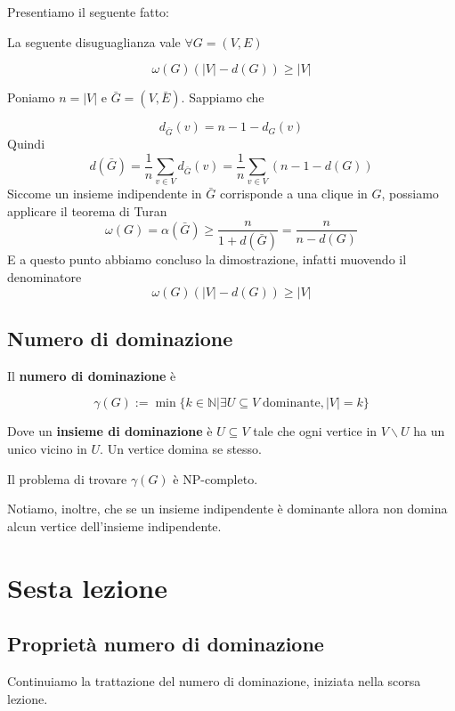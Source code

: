 \documentclass[12pt]{report}
\begin{document}
\noindent 
Presentiamo il seguente fatto:

\begin{fatto}
    La seguente disuguaglianza vale $\forall G = (V,E)$

    $$ \omega(G) (|V| - d(G)) \geq |V|$$
\end{fatto}

\begin{dimo}
    Poniamo $n = |V|$ e $\bar G = (V,\bar E)$. Sappiamo che 

    $$d_{\bar G} (v) = n - 1 - d_G(v)$$
    Quindi
    $$d(\bar G) = \frac{1}{n} \sum_{v \in V} d_{\bar G}(v) = \frac{1}{n} \sum_{v \in V} (n - 1 - d(G))$$
    Siccome un insieme indipendente  in $\bar G$ corrisponde a una clique in $G$, possiamo applicare il teorema di Turan 
    $$\omega(G) = \alpha(\bar G) \geq \frac{n}{1 + d(\bar G)} = \frac{n}{n - d(G)} $$
    E a questo punto abbiamo concluso la dimostrazione, infatti muovendo il denominatore
    $$\omega(G) (|V| - d(G)) \geq |V|$$
\end{dimo}

\section{Numero di dominazione}

\begin{defi}
    Il \textbf{numero di dominazione} è 

    $$
    \gamma(G):= \min\{k \in \mathbb{N} | \exists U \subseteq V \; \text{dominante}, |V| = k\} 
    $$
\end{defi}
\noindent 
Dove un \textbf{insieme di dominazione} è $U \subseteq V$ tale che ogni vertice in $V \backslash U$ ha un unico vicino in $U$. Un vertice domina se stesso.

Il problema di trovare $\gamma(G)$ è NP-completo.

Notiamo, inoltre, che se un insieme indipendente è dominante allora non domina alcun vertice dell'insieme indipendente.

\chapter{Sesta lezione}

\section{Proprietà numero di dominazione}

Continuiamo la trattazione del numero di dominazione, iniziata nella scorsa lezione.
\end{document}
